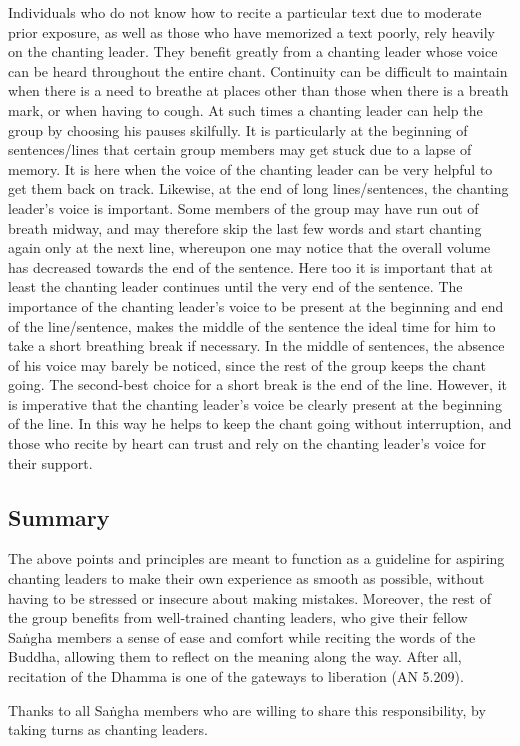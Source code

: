   Individuals who do not know how to recite a particular text due to moderate prior exposure, as well as those who have memorized a text poorly, rely heavily on the chanting leader. They benefit greatly from a chanting leader whose voice can be heard throughout the entire chant. Continuity can be difficult to maintain when there is a need to breathe at places other than those when there is a breath mark, or when having to cough. At such times a chanting leader can help the group by choosing his pauses skilfully. It is particularly at the beginning of sentences/lines that certain group members may get stuck due to a lapse of memory. It is here when the voice of the chanting leader can be very helpful to get them back on track. Likewise, at the end of long lines/sentences, the chanting leader's voice is important. Some members of the group may have run out of breath midway, and may therefore skip the last few words and start chanting again only at the next line, whereupon one may notice that the overall volume has decreased towards the end of the sentence. Here too it is important that at least the chanting leader continues until the very end of the sentence. The importance of the chanting leader's voice to be present at the beginning and end of the line/sentence, makes the middle of the sentence the ideal time for him to take a short breathing break if necessary. In the middle of sentences, the absence of his voice may barely be noticed, since the rest of the group keeps the chant going. The second-best choice for a short break is the end of the line. However, it is imperative that the chanting leader's voice be clearly present at the beginning of the line. In this way he helps to keep the chant going without interruption, and those who recite by heart can trust and rely on the chanting leader's voice for their support.

\subsection*{Summary}

  The above points and principles are meant to function as a guideline for aspiring chanting leaders to make their own experience as smooth as possible, without having to be stressed or insecure about making mistakes. Moreover, the rest of the group benefits from well-trained chanting leaders, who give their fellow Saṅgha members a sense of ease and comfort while reciting the words of the Buddha, allowing them to reflect on the meaning along the way. \ifninebythirteenversion\clearpage\fi After all, recitation of the Dhamma is one of the gateways to liberation (AN 5.209).

  Thanks to all Saṅgha members who are willing to share this responsibility, by taking turns as chanting leaders.
